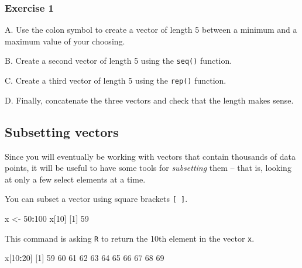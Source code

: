 \documentclass[
]{book}
\newenvironment{Shaded}{\begin{snugshade}}{\end{snugshade}}
\newcommand{\DecValTok}[1]{\textcolor[rgb]{0.00,0.00,0.81}{#1}}
\newcommand{\NormalTok}[1]{#1}
\newcommand{\OperatorTok}[1]{\textcolor[rgb]{0.81,0.36,0.00}{\textbf{#1}}}
\newcommand{\StringTok}[1]{\textcolor[rgb]{0.31,0.60,0.02}{#1}}
\begin{document}
\hypertarget{exercise-1-3}{%
\subsubsection*{Exercise 1}\label{exercise-1-3}}

A. Use the colon symbol to create a vector of length 5 between a minimum and a maximum value of your choosing.

B. Create a second vector of length 5 using the \texttt{seq()} function.

C. Create a third vector of length 5 using the \texttt{rep()} function.

D. Finally, concatenate the three vectors and check that the length makes sense.

\hypertarget{subsetting-vectors}{%
\subsection*{Subsetting vectors}\label{subsetting-vectors}}

Since you will eventually be working with vectors that contain thousands of data points, it will be useful to have some tools for \emph{subsetting} them -- that is, looking at only a few select elements at a time.

You can subset a vector using square brackets \texttt{{[}\ {]}}.

\begin{Shaded}
\begin{Highlighting}[]
\NormalTok{x <-}\StringTok{ }\DecValTok{50}\OperatorTok{:}\DecValTok{100}
\NormalTok{x[}\DecValTok{10}\NormalTok{]}
\NormalTok{[}\DecValTok{1}\NormalTok{] }\DecValTok{59}
\end{Highlighting}
\end{Shaded}

This command is asking \texttt{R} to return the 10th element in the vector \texttt{x}.

\begin{Shaded}
\begin{Highlighting}[]
\NormalTok{x[}\DecValTok{10}\OperatorTok{:}\DecValTok{20}\NormalTok{]}
\NormalTok{ [}\DecValTok{1}\NormalTok{] }\DecValTok{59} \DecValTok{60} \DecValTok{61} \DecValTok{62} \DecValTok{63} \DecValTok{64} \DecValTok{65} \DecValTok{66} \DecValTok{67} \DecValTok{68} \DecValTok{69}
\end{Highlighting}
\end{Shaded}
\end{document}
